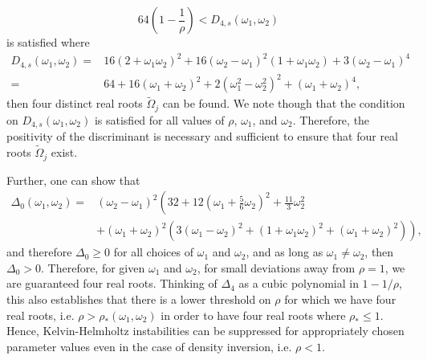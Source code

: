 \documentclass[a4paper,11pt]{article}
\begin{document}
\[
64\left(1-\frac{1}{\rho} \right) < D_{4,s}(\omega_{1},\omega_{2})
\]
is satisfied where
\begin{align*}
 D_{4,s}(\omega_{1},\omega_{2}) = & 16\left( 2 + \omega_{1}\omega_{2}\right)^{2} + 16\left(\omega_{2}-\omega_{1} \right)^{2}\left(1+\omega_{1}\omega_{2} \right) + 3\left( \omega_{2}-\omega_{1}\right)^{4}\\
=& 64 + 16(\omega_{1}+\omega_{2})^2+2(\omega^{2}_{1}-\omega_{2}^{2})^{2}+(\omega_{1}+\omega_{2})^{4}, 
\end{align*}
then four distinct real roots $\tilde{\Omega}_{j}$ can be found.  We note though that the condition on $D_{4,s}(\omega_{1},\omega_{2})$ is satisfied for all values of $\rho$, $\omega_{1}$, and $\omega_{2}$.  Therefore, the positivity of the discriminant is necessary and sufficient to ensure that four real roots $\tilde{\Omega}_{j}$ exist.  

Further, one can show that 
\begin{align*}
\Delta_{0}(\omega_{1},\omega_{2}) = & (\omega_{2}-\omega_{1})^{2}\left(32 + 12\left(\omega_{1}+\frac{5}{6}\omega_{2}\right)^{2} + \frac{11}{3}\omega^{2}_{2} \right.\\
&\left.+ (\omega_{1}+\omega_{2})^{2}\left(3(\omega_{1}-\omega_{2})^2+(1+\omega_{1}\omega_{2})^2+(\omega_{1}+\omega_{2})^2 \right) \right), 
\end{align*}
and therefore $\Delta_{0}\geq 0$ for all choices of $\omega_{1}$ and $\omega_{2}$, and as long as $\omega_{1}\neq\omega_{2}$, then $\Delta_{0} > 0$.  Therefore, for given $\omega_{1}$ and $\omega_{2}$, for small deviations away from $\rho = 1$, we are guaranteed four real roots.  Thinking of $\Delta_{4}$ as a cubic polynomial in $1-1/\rho$, this also establishes that there is a lower threshold on $\rho$ for which we have four real roots, i.e. $\rho > \rho_{\ast}(\omega_{1},\omega_{2})$ in order to have four real roots where $\rho_{\ast}\leq1$. Hence, Kelvin-Helmholtz instabilities can be suppressed for appropriately chosen parameter values even in the case of density inversion, i.e. $\rho<1$.   
\end{document}
